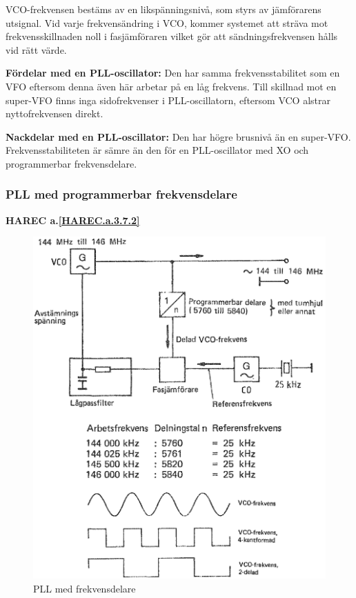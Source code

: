 VCO-frekvensen bestäms av en likspänningsnivå, som styrs av jämförarens
utsignal.
Vid varje frekvensändring i VCO, kommer systemet att sträva mot
frekvensskillnaden noll i fasjämföraren vilket gör att sändningsfrekvensen
hålls vid rätt värde.

\textbf{Fördelar med en PLL-oscillator:}
Den har samma frekvensstabilitet som en VFO eftersom denna även här arbetar på
en låg frekvens.
Till skillnad mot en super-VFO finns inga sidofrekvenser i PLL-oscillatorn,
eftersom VCO alstrar nyttofrekvensen direkt.

\textbf{Nackdelar med en PLL-oscillator:}
Den har högre brusnivå än en super-VFO.
Frekvensstabiliteten är sämre än den för en PLL-oscillator med XO och
programmerbar frekvensdelare.

\subsubsection{PLL med programmerbar frekvensdelare}
\textbf{HAREC a.\ref{HAREC.a.3.7.2}\label{myHAREC.a.3.7.2}}

\begin{figure}
\includegraphics[width=\textwidth]{images/cropped_pdfs/bild_2_3-82.pdf}
\caption{PLL med frekvensdelare}
\label{fig:BildII3-82}
\end{figure}

